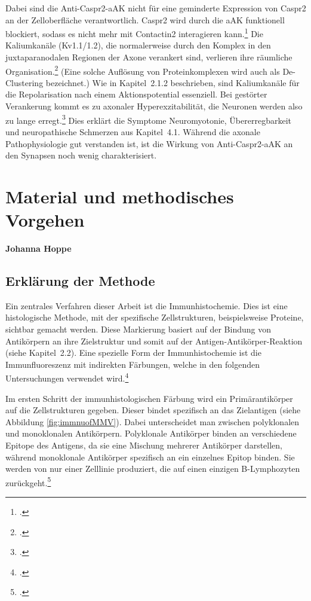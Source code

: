 \documentclass[a4paper, 12pt]{scrreprt}
\begin{document}
    Dabei sind die Anti-Caspr2-aAK nicht für eine geminderte Expression von
    Caspr2 an der Zelloberfläche verantwortlich. Caspr2 wird durch die aAK
    funktionell blockiert, sodass es nicht mehr mit Contactin2 interagieren
    kann.\footcite[S.~6--7]{Patterson2018}
    Die Kaliumkanäle (Kv1.1/1.2), die normalerweise durch den Komplex in den
    juxtaparanodalen Regionen der Axone verankert sind, verlieren ihre
    räumliche
    Organisation.\footcites{Mitrevski}[S.~8]{Patterson2018}
    (Eine solche Auflösung von Proteinkomplexen wird auch als
    De-Clustering bezeichnet.)
    Wie in Kapitel~2.1.2 beschrieben, sind Kaliumkanäle für die
    Repolarisation nach einem Aktionspotential essenziell. Bei gestörter
    Verankerung kommt es zu axonaler Hyperexzitabilität, die Neuronen werden
    also zu lange
    erregt.\footcite[S.~525--526]{VanSonderen2016}
    Dies erklärt die Symptome Neuromyotonie, Übererregbarkeit und
    neuropathische Schmerzen aus Kapitel~4.1. Während die axonale Pathophysiologie gut verstanden ist,
    ist die Wirkung von Anti-Caspr2-aAK an den Synapsen noch wenig
    charakterisiert.

\chapter{Material und methodisches Vorgehen}
\textbf{Johanna Hoppe}
    \section{Erklärung der Methode}
    Ein zentrales Verfahren dieser Arbeit ist die
    Immunhistochemie. Dies ist eine histologische Methode, mit der
    spezifische Zellstrukturen, beispielsweise Proteine, sichtbar gemacht
    werden. Diese Markierung basiert auf der Bindung von Antikörpern an ihre
    Zielstruktur und somit auf der Antigen-Antikörper-Reaktion (siehe
    Kapitel~2.2). Eine spezielle Form der Immunhistochemie ist die
    Immunfluoreszenz mit indirekten Färbungen, welche in den folgenden
    Untersuchungen verwendet wird.\footcite{LeicaIHC2026}
    
    Im ersten Schritt der immunhistologischen Färbung wird ein
    Primärantikörper auf die Zellstrukturen gegeben. Dieser bindet
    spezifisch an das Zielantigen (siehe Abbildung \ref{fig:immnuofMMV}). Dabei unterscheidet man
    zwischen polyklonalen und monoklonalen Antikörpern. Polyklonale
    Antikörper binden an verschiedene Epitope des Antigens, da sie eine
    Mischung mehrerer Antikörper darstellen, während monoklonale Antikörper
    spezifisch an ein einzelnes Epitop binden. Sie werden von nur einer
    Zelllinie produziert, die auf einen einzigen B-Lymphozyten
    zurückgeht.\footcites{DocCheckMonoklonal}{DocCheckIHC}
    
\end{document}
